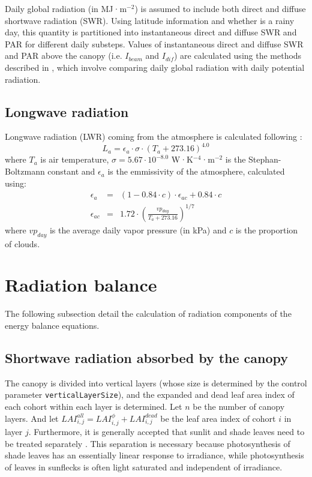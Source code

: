 \documentclass[]{book}
\begin{document}
Daily global radiation (in MJ·m\(^{-2}\)) is assumed to include both direct and diffuse shortwave radiation (SWR). Using latitude information and whether is a rainy day, this quantity is partitioned into instantaneous direct and diffuse SWR and PAR for different daily substeps. Values of instantaneous direct and diffuse SWR and PAR above the canopy (i.e. \(I_{beam}\) and \(I_{dif}\)) are calculated using the methods described in \citet{Spitters1986}, which involve comparing daily global radiation with daily potential radiation.

\hypertarget{longwave-radiation}{%
\section{Longwave radiation}\label{longwave-radiation}}

Longwave radiation (LWR) coming from the atmosphere is calculated following \citet{Campbell1998}:
\begin{equation}
L_{a} = \epsilon_{a} \cdot \sigma \cdot (T_{a} + 273.16)^{4.0}
\end{equation}
where \(T_{a}\) is air temperature, \(\sigma = 5.67 \cdot 10^{-8.0}\) W·K\(^{-4}\)·m\(^{-2}\) is the Stephan-Boltzmann constant and \(\epsilon_{a}\) is the emmissivity of the atmosphere, calculated using:
\begin{eqnarray}
\epsilon_{a} &=& (1 - 0.84 \cdot c) \cdot \epsilon_{ac} + 0.84 \cdot c \\
\epsilon_{ac} &=& 1.72 \cdot \left(\frac{vp_{day}}{T_{a} + 273.16} \right)^{1/7}
\end{eqnarray}
where \(vp_{day}\) is the average daily vapor pressure (in kPa) and \(c\) is the proportion of clouds.

\hypertarget{radiation-balance}{%
\chapter{Radiation balance}\label{radiation-balance}}

The following subsection detail the calculation of radiation components of the energy balance equations.

\hypertarget{shortwave-radiation-absorbed-by-the-canopy}{%
\section{Shortwave radiation absorbed by the canopy}\label{shortwave-radiation-absorbed-by-the-canopy}}

The canopy is divided into vertical layers (whose size is determined by the control parameter \texttt{verticalLayerSize}), and the expanded and dead leaf area index of each cohort within each layer is determined. Let \(n\) be the number of canopy layers. And let \(LAI_{i,j}^{all} = LAI_{i,j}^{\phi}+LAI_{i,j}^{dead}\) be the leaf area index of cohort \(i\) in layer \(j\). Furthermore, it is generally accepted that sunlit and shade leaves need to be treated separately \citep{DePury1997}. This separation is necessary because photosynthesis of shade leaves has an essentially linear response to irradiance, while photosynthesis of leaves in sunflecks is often light saturated and independent of irradiance.
\end{document}
